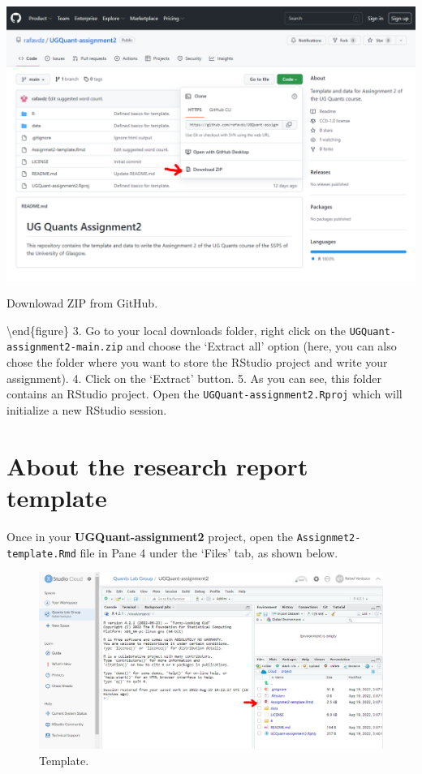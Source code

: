 \documentclass[
]{book}
\begin{document}
\includegraphics[width=1\linewidth]{./images/research_rep_4} \hfill{}

\caption{Downlowad ZIP from GitHub.}

\label{fig:unnamed-chunk-115}
\textbackslash end\{figure\}
3. Go to your local downloads folder, right click on the \texttt{UGQuant-assignment2-main.zip} and choose the `Extract all' option (here, you can also chose the folder where you want to store the RStudio project and write your assignment).
4. Click on the `Extract' button.
5. As you can see, this folder contains an RStudio project. Open the \texttt{UGQuant-assignment2.Rproj} which will initialize a new RStudio session.

\hypertarget{about-the-research-report-template}{%
\section{About the research report template}\label{about-the-research-report-template}}

Once in your \textbf{UGQuant-assignment2} project, open the \texttt{Assignmet2-template.Rmd} file in Pane 4 under the `Files' tab, as shown below.

\begin{figure}

\includegraphics[width=1\linewidth]{./images/research_rep_3} \hfill{}

\caption{Template.}\label{fig:unnamed-chunk-116}
\end{figure}
\end{document}
